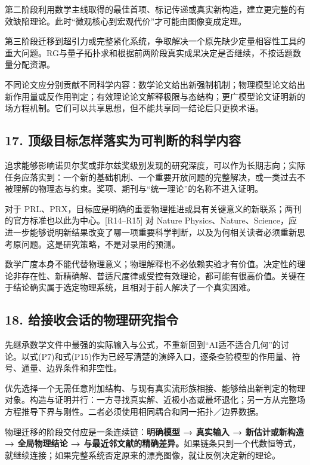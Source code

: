 \documentclass[UTF8,a4paper,11pt,fontset=fandol]{ctexart}
\begin{document}
第二阶段利用数学主线取得的最佳首项、标记传递或真实新构造，建立更完整的有效缺陷理论。此时``微观核心到宏观代价''才可能由图像变成定理。

第三阶段迁移到超引力或完整紧化系统，争取解决一个原先缺少定量相容性工具的重大问题。RG与量子拓扑求和根据前两阶段真实成果决定是否继续，不按话题数量分配资源。

不同论文应分别贡献不同科学内容：数学论文给出新强制机制；物理模型论文给出新作用量或反作用判定；有效理论论文解释极限与态结构；更广模型论文证明新的场方程机制。它们可以共享思想，但不能共享同一结论后只更换术语。

\subsection{17.
顶级目标怎样落实为可判断的科学内容}\label{ux9876ux7ea7ux76eeux6807ux600eux6837ux843dux5b9eux4e3aux53efux5224ux65adux7684ux79d1ux5b66ux5185ux5bb9}

追求能够影响诺贝尔奖或菲尔兹奖级别发现的研究深度，可以作为长期志向；实际任务应落实到：一个新的基础机制、一个重要开放问题的完整解决，或一类过去不被理解的物理态与约束。奖项、期刊与``统一理论''的名称不进入证明。

对于
PRL、PRX，目标应是明确的重要物理推进或具有关键意义的新联系；两刊的官方标准也以此为中心。{[}R14--R15{]}
对 Nature
Physics、Nature、Science，应进一步能够说明新结果改变了哪一项重要科学判断，以及为何相关读者必须重新思考原问题。这是研究策略，不是对录用的预测。

数学广度本身不能代替物理意义；物理解释也不必依赖实验才有价值。决定性的理论非存在性、新精确解、普适尺度律或受控有效理论，都可能有很高价值。关键在于结论确实属于选定物理系统，且相对于前人解决了一个真实困难。

\subsection{18.
给接收会话的物理研究指令}\label{ux7ed9ux63a5ux6536ux4f1aux8bddux7684ux7269ux7406ux7814ux7a76ux6307ux4ee4}

先继承数学文件中最强的实际输入与公式，不重新回到``AI适不适合几何''的讨论。以式(P7)和式(P15)作为已经写清楚的演绎入口，逐条查验模型的作用量、符号、通量、边界条件和非空性。

优先选择一个无需任意附加结构、与现有真实流形族相接、能够给出新判定的物理对象。构造与证明并行：一方寻找真实解、近极小态或最坏退化；另一方从完整场方程推导下界与刚性。二者必须使用相同耦合和同一拓扑／边界数据。

物理迁移的阶段交付应是一条连续链：\textbf{明确模型 → 真实输入 →
新估计或新构造 → 全局物理结论 →
与最近邻文献的精确差异。}如果链条只到一个代数恒等式，就继续连接；如果完整系统否定原来的漂亮图像，就让反例决定新的理论。
\end{document}
